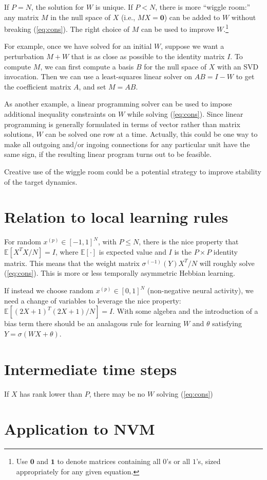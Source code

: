 \documentclass[pdftex,12pt,letterpaper]{article}
\begin{document}
If $P=N$, the solution for $W$ is unique.  If $P<N$, there is more ``wiggle room:'' any matrix $M$ in the null space of $X$ (i.e., $MX = \mathbf{0}$) can be added to $W$ without breaking (\ref{eq:cons}).  The right choice of $M$ can be used to improve $W$.\footnote{Use $\mathbf{0}$ and $\mathbf{1}$ to denote matrices containing all $0$'s or all $1$'s, sized appropriately for any given equation.}

For example, once we have solved for an initial $W$, suppose we want a perturbation $M+W$ that is as close as possible to the identity matrix $I$.  To compute $M$, we can first compute a basis $B$ for the null space of $X$ with an SVD invocation.  Then we can use a least-squares linear solver on $AB = I-W$ to get the coefficient matrix $A$, and set $M = AB$.

As another example, a linear programming solver can be used to impose additional inequality constraints on $W$ while solving (\ref{eq:cons}).  Since linear programming is generally formulated in terms of vector rather than matrix solutions, $W$ can be solved one row at a time.  Actually, this could be one way to make all outgoing and/or ingoing connections for any particular unit have the same sign, if the resulting linear program turns out to be feasible.

Creative use of the wiggle room could be a potential strategy to improve stability of the target dynamics.

\section{Relation to local learning rules}

For random $x^{(p)} \in [-1,1]^N$, with $P \leq N$, there is the nice property that $\mathbb{E}[X^TX/N] = I$, where $\mathbb{E}[\cdot]$ is expected value and $I$ is the $P\times P$ identity matrix.  This means that the weight matrix $\sigma^{(-1)}(Y)X^T/N$ will roughly solve (\ref{eq:cons}).  This is more or less temporally asymmetric Hebbian learning.

If instead we choose random $x^{(p)}\in [0,1]^N$ (non-negative neural activity), we need a change of variables to leverage the nice property: $\mathbb{E}[(2X+1)^T(2X+1)/N] = I$.  With some algebra and the introduction of a bias term there should be an analagous rule for learning $W$ and $\theta$ satisfying $Y = \sigma(WX + \theta)$.

\section{Intermediate time steps}

If $X$ has rank lower than $P$, there may be no $W$ solving (\ref{eq:cons})

\section{Application to NVM}
\end{document}

